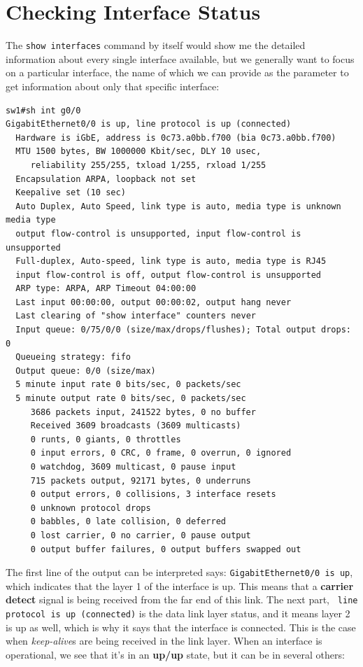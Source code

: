 \section{Checking Interface Status}
The \verb|show interfaces| command by itself would show me the detailed information about every single interface available, but we generally want to focus on a particular interface, the name of which we can provide as the parameter to get information about only that specific interface:

\vspace{-15pt}
\begin{verbatim}
sw1#sh int g0/0
GigabitEthernet0/0 is up, line protocol is up (connected)
  Hardware is iGbE, address is 0c73.a0bb.f700 (bia 0c73.a0bb.f700)
  MTU 1500 bytes, BW 1000000 Kbit/sec, DLY 10 usec,
     reliability 255/255, txload 1/255, rxload 1/255
  Encapsulation ARPA, loopback not set
  Keepalive set (10 sec)
  Auto Duplex, Auto Speed, link type is auto, media type is unknown media type
  output flow-control is unsupported, input flow-control is unsupported
  Full-duplex, Auto-speed, link type is auto, media type is RJ45
  input flow-control is off, output flow-control is unsupported
  ARP type: ARPA, ARP Timeout 04:00:00
  Last input 00:00:00, output 00:00:02, output hang never
  Last clearing of "show interface" counters never
  Input queue: 0/75/0/0 (size/max/drops/flushes); Total output drops: 0
  Queueing strategy: fifo
  Output queue: 0/0 (size/max)
  5 minute input rate 0 bits/sec, 0 packets/sec
  5 minute output rate 0 bits/sec, 0 packets/sec
     3686 packets input, 241522 bytes, 0 no buffer
     Received 3609 broadcasts (3609 multicasts)
     0 runts, 0 giants, 0 throttles
     0 input errors, 0 CRC, 0 frame, 0 overrun, 0 ignored
     0 watchdog, 3609 multicast, 0 pause input
     715 packets output, 92171 bytes, 0 underruns
     0 output errors, 0 collisions, 3 interface resets
     0 unknown protocol drops
     0 babbles, 0 late collision, 0 deferred
     0 lost carrier, 0 no carrier, 0 pause output
     0 output buffer failures, 0 output buffers swapped out
\end{verbatim}
\vspace{-10pt}

\noindent
The first line of the output can be interpreted says: \verb|GigabitEthernet0/0 is up|, which indicates that the layer 1 of the interface is up. This means that a \textbf{carrier detect} signal is being received from the far end of this link. The next part, \verb| line protocol is up (connected)| is the data link layer status, and it means layer 2 is up as well, which is why it says that the interface is connected. This is the case when \textit{keep-alive}s are being received in the link layer. When an interface is operational, we see that it's in an \textbf{up/up} state, but it can be in several others:

